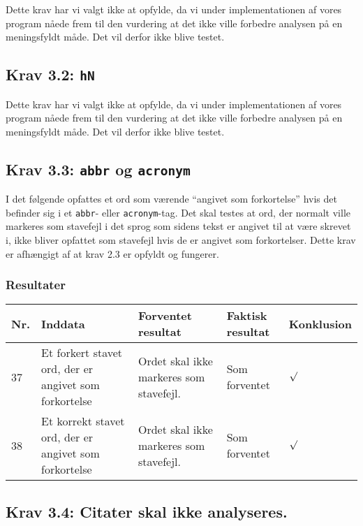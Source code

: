 \documentclass[a4paper,oneside,article]{memoir}
\begin{document}
\begin{landscape}
Dette krav har vi valgt ikke at opfylde, da vi under implementationen
af vores program nåede frem til den vurdering at det ikke ville
forbedre analysen på en meningsfyldt måde. Det vil derfor ikke blive
testet.

\subsection{Krav 3.2: \texttt{hN}}

Dette krav har vi valgt ikke at opfylde, da vi under implementationen
af vores program nåede frem til den vurdering at det ikke ville
forbedre analysen på en meningsfyldt måde. Det vil derfor ikke blive
testet.

\subsection{Krav 3.3: \texttt{abbr} og \texttt{acronym}}

I det følgende opfattes et ord som værende ``angivet som forkortelse''
hvis det befinder sig i et \texttt{abbr}- eller
\texttt{acronym}-tag. Det skal testes at ord, der normalt ville
markeres som stavefejl i det sprog som sidens tekst er angivet til at
være skrevet i, ikke bliver opfattet som stavefejl hvis de er angivet
som forkortelser. Dette krav er afhængigt af at krav 2.3 er opfyldt og
fungerer.

\subsubsection{Resultater}
\begin{longtable}[c]{p{20pt}|p{220pt}|p{130pt}|p{130pt}|p{50pt}}
\textbf{Nr.} &
\textbf{Inddata} &
\textbf{Forventet resultat} &
\textbf{Faktisk resultat} &
\textbf{Konklusion} \\ \hline

37 &
Et forkert stavet ord, der er angivet som forkortelse &
Ordet skal ikke markeres som stavefejl. &
Som forventet &
$\surd$ \\ \hline

38 &
Et korrekt stavet ord, der er angivet som forkortelse &
Ordet skal ikke markeres som stavefejl. &
Som forventet &
$\surd$ \\ \hline

\end{longtable}

\subsection{Krav 3.4: Citater skal ikke analyseres.}


\end{landscape}
\end{document}
